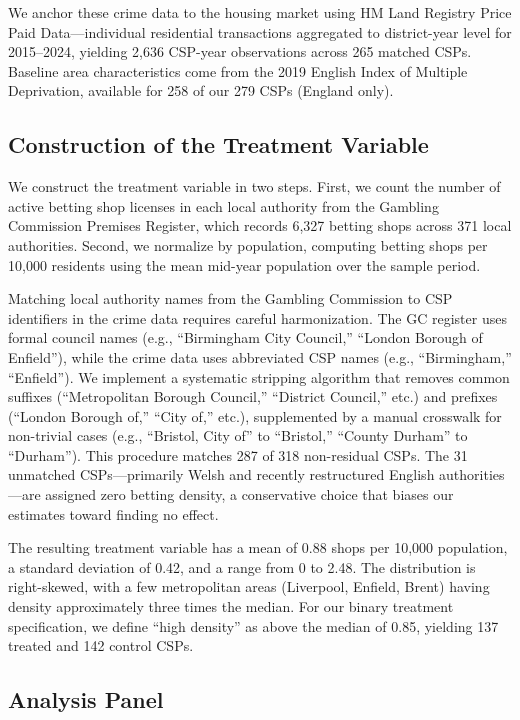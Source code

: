 \documentclass[12pt]{article}
\begin{document}
We anchor these crime data to the housing market using HM Land Registry Price Paid Data---individual residential transactions aggregated to district-year level for 2015--2024, yielding 2,636 CSP-year observations across 265 matched CSPs. Baseline area characteristics come from the 2019 English Index of Multiple Deprivation, available for 258 of our 279 CSPs (England only).

\subsection{Construction of the Treatment Variable}

We construct the treatment variable in two steps. First, we count the number of active betting shop licenses in each local authority from the Gambling Commission Premises Register, which records 6,327 betting shops across 371 local authorities. Second, we normalize by population, computing betting shops per 10,000 residents using the mean mid-year population over the sample period.

Matching local authority names from the Gambling Commission to CSP identifiers in the crime data requires careful harmonization. The GC register uses formal council names (e.g., ``Birmingham City Council,'' ``London Borough of Enfield''), while the crime data uses abbreviated CSP names (e.g., ``Birmingham,'' ``Enfield''). We implement a systematic stripping algorithm that removes common suffixes (``Metropolitan Borough Council,'' ``District Council,'' etc.) and prefixes (``London Borough of,'' ``City of,'' etc.), supplemented by a manual crosswalk for non-trivial cases (e.g., ``Bristol, City of'' to ``Bristol,'' ``County Durham'' to ``Durham''). This procedure matches 287 of 318 non-residual CSPs. The 31 unmatched CSPs---primarily Welsh and recently restructured English authorities---are assigned zero betting density, a conservative choice that biases our estimates toward finding no effect.

The resulting treatment variable has a mean of 0.88 shops per 10,000 population, a standard deviation of 0.42, and a range from 0 to 2.48. The distribution is right-skewed, with a few metropolitan areas (Liverpool, Enfield, Brent) having density approximately three times the median. For our binary treatment specification, we define ``high density'' as above the median of 0.85, yielding 137 treated and 142 control CSPs.

\subsection{Analysis Panel}
\end{document}
